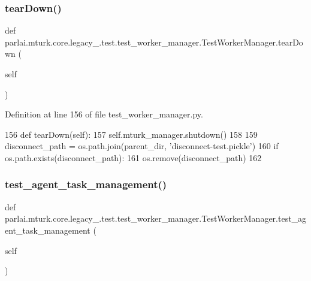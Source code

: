 \subsubsection{\texorpdfstring{tear\+Down()}{tearDown()}}
{\footnotesize\ttfamily def parlai.\+mturk.\+core.\+legacy\+\_.\+test.\+test\+\_\+worker\+\_\+manager.\+Test\+Worker\+Manager.\+tear\+Down (\begin{DoxyParamCaption}\item[{}]{self }\end{DoxyParamCaption})}



Definition at line 156 of file test\+\_\+worker\+\_\+manager.\+py.


\begin{DoxyCode}
156     \textcolor{keyword}{def }tearDown(self):
157         self.mturk\_manager.shutdown()
158 
159         disconnect\_path = os.path.join(parent\_dir, \textcolor{stringliteral}{'disconnect-test.pickle'})
160         \textcolor{keywordflow}{if} os.path.exists(disconnect\_path):
161             os.remove(disconnect\_path)
162 
\end{DoxyCode}
\mbox{\label{classparlai_1_1mturk_1_1core_1_1legacy__2018_1_1test_1_1test__worker__manager_1_1TestWorkerManager_a678dccd5eac5bd04901b5dfe6edf4b1f}} 
\subsubsection{\texorpdfstring{test\+\_\+agent\+\_\+task\+\_\+management()}{test\_agent\_task\_management()}}
{\footnotesize\ttfamily def parlai.\+mturk.\+core.\+legacy\+\_.\+test.\+test\+\_\+worker\+\_\+manager.\+Test\+Worker\+Manager.\+test\+\_\+agent\+\_\+task\+\_\+management (\begin{DoxyParamCaption}\item[{}]{self }\end{DoxyParamCaption})}

